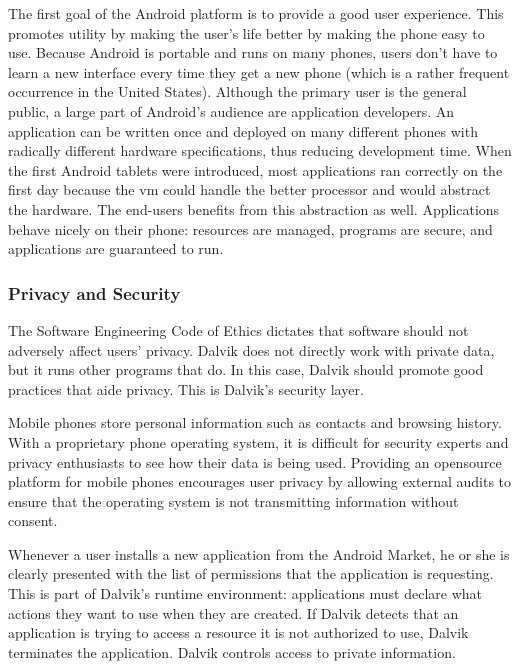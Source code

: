 \documentclass[11pt]{article}
\begin{document}
\begin{multicols}{2}
The first goal of the Android platform is to provide a good user experience.
This promotes utility by making the user's life better by making the phone easy
to use.  Because Android is portable and runs on many phones, users don't have
to learn a new interface every time they get a new phone (which is a rather
frequent occurrence in the United States).  Although the primary user is the
general public, a large part of Android's audience are application developers.
An application can be written once and deployed on many different phones with
radically different hardware specifications, thus reducing development time.
When the first Android tablets were introduced, most applications ran correctly
on the first day because the \gls{vm} could handle the better processor and
would abstract the hardware.  The end-users benefits from this abstraction as
well.  Applications behave nicely on their phone: resources are managed,
programs are secure, and applications are guaranteed to run.


\subsubsection{Privacy and Security} %
\label{ssub:privacy}

The Software Engineering Code of Ethics dictates that software should not
adversely affect users' privacy.  Dalvik does not directly work with private
data, but it runs other programs that do.  In this case, Dalvik should promote
good practices that aide privacy.  This is Dalvik's security layer.

Mobile phones store personal information such as contacts and browsing history.
With a proprietary phone operating system, it is difficult for security experts
and privacy enthusiasts to see how their data is being used.  Providing an
\gls{opensource} platform for mobile phones encourages user privacy by allowing
external audits to ensure that the operating system is not transmitting
information without consent.

Whenever a user installs a new application from the Android Market, he or she is
clearly presented with the list of permissions that the application is
requesting.  This is part of Dalvik's runtime environment: applications must
declare what actions they want to use when they are created.  If Dalvik detects
that an application is trying to access a resource it is not authorized to use,
Dalvik terminates the application.  Dalvik controls access to private
information.


\end{multicols}
\end{document}
